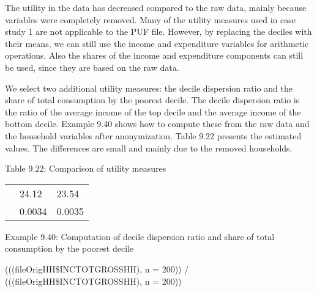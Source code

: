 \documentclass[letterpaper,10pt,english]{sphinxmanual}
\begin{document}


The utility in the data has decreased compared to the raw data, mainly
because variables were completely removed. Many of the utility measures
used in case study 1 are not applicable to the PUF file. However, by
replacing the deciles with their means, we can still use the income and
expenditure variables for arithmetic operations. Also the shares of the
income and expenditure components can still be used, since they are
based on the raw data.

We select two additional utility measures: the decile dispersion ratio
and the share of total consumption by the poorest decile. The decile
dispersion ratio is the ratio of the average income of the top decile
and the average income of the bottom decile. Example 9.40 shows how to
compute these from the raw data and the household variables after
anonymization. Table 9.22 presents the estimated values. The differences
are small and mainly due to the removed households.

Table 9.22: Comparison of utility measures


\begin{savenotes}\sphinxattablestart
\centering
\begin{tabulary}{\linewidth}[t]{|T|T|T|}
\hline
\sphinxstyletheadfamily &\sphinxstyletheadfamily 
{}
&\sphinxstyletheadfamily 
{}
\\
\hline
{}
&
24.12
&
23.54
\\
\hline
{}
&
0.0034
&
0.0035
\\
\hline
\end{tabulary}
\par
\sphinxattableend\end{savenotes}

Example 9.40: Computation of decile dispersion ratio and share of total
consumption by the poorest decile

\begin{DUlineblock}{0em}
\item[] 
\item[] 
\item[] (((fileOrigHH\$INCTOTGROSSHH), n = 200))
/ (((fileOrigHH\$INCTOTGROSSHH), n =
200))
\end{DUlineblock}
\end{document}
